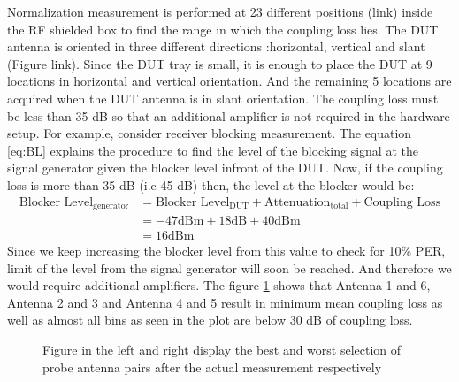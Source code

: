 Normalization measurement is performed at 23 different positions (link) inside the RF shielded box to find the range in which the coupling loss lies. The \acs{DUT} antenna is oriented in three different directions :horizontal, vertical and slant (Figure link). Since the DUT tray is small, it is enough to place the \acs{DUT} at 9 locations in horizontal and vertical orientation. And the remaining 5 locations are acquired when the \acs{DUT} antenna is in slant orientation. The coupling loss must be less than 35 dB so that an additional amplifier is not required in the hardware setup. For example, consider receiver blocking measurement. The equation \ref{eq:BL} explains the procedure to find the level of the blocking signal at the signal generator given the blocker level  infront of the \acs{DUT}. Now, if the coupling loss is more than 35 dB (i.e 45 dB) then, the level at the blocker would be:
\begin{equation}
\begin{split}
\mbox{Blocker Level}_{\mbox{generator}}  &= \mbox{Blocker Level}_{\mbox{DUT}} + \mbox{Attenuation}_{\mbox{total}} + \mbox{Coupling Loss} \label{eq:egBL} \\
& = -47 \mbox{dBm} + 18 \mbox{dB} + 40 \mbox{dBm} \\
& = 16 \mbox{dBm}
\end{split}
\end{equation}
Since we keep increasing the blocker level from this value to check for 10\% \acs{PER}, limit of the level from the signal generator will soon be reached. And therefore we would require additional amplifiers. The figure \ref{fig:man} shows that Antenna 1 and 6, Antenna 2 and 3 and Antenna 4 and 5 result in minimum mean coupling loss as well as almost all bins as seen in the plot are below 30 dB of coupling loss.

\begin{figure}[H]
\caption{Figure in the left and right display the best and worst selection of probe antenna pairs after the actual measurement respectively}
\label{fig:man}
\end{figure}

